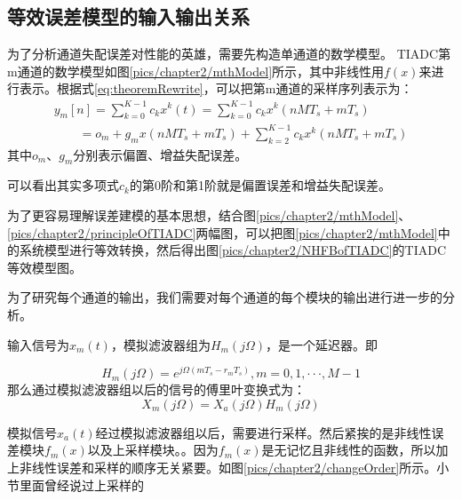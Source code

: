 	\subsection{等效误差模型的输入输出关系}
		为了分析通道失配误差对性能的英雄，需要先构造单通道的数学模型。
		TIADC第m通道的数学模型如图\ref{pics/chapter2/mthModel}所示，其中非线性用$f(x)$来进行表示。根据式\ref{eq:theoremRewrite}，可以把第m通道的采样序列表示为：
			\begin{equation}
				\begin{array}{l}
{y_m}\left[ n \right] = \sum\limits_{k = 0}^{K - 1} {{c_k}{x^k}\left( t \right)}  = \sum\limits_{k = 0}^{K - 1} {{c_k}{x^k}\left( {nM{T_s} + m{T_s}} \right)} \\
\,\,\,\,\,\,\,\,\,\,\,\, = {o_m} + {g_m}x\left( {nM{T_s} + m{T_s}} \right) + \sum\limits_{k = 2}^{K - 1} {{c_k}{x^k}\left( {nM{T_s} + m{T_s}} \right)} 
\end{array}
			\end{equation}
		其中$o_m$、$g_m$分别表示偏置、增益失配误差。\par
		可以看出其实多项式$c_k$的第0阶和第1阶就是偏置误差和增益失配误差。\par
		为了更容易理解误差建模的基本思想，结合图\ref{pics/chapter2/mthModel}、\ref{pics/chapter2/principleOfTIADC}两幅图，可以把图\ref{pics/chapter2/mthModel}中的系统模型进行等效转换，然后得出图\ref{pics/chapter2/NHFBofTIADC}的TIADC等效模型图。
			
		
	为了研究每个通道的输出，我们需要对每个通道的每个模块的输出进行进一步的分析。
	\par
	输入信号为${x_m}(t)$，模拟滤波器组为${H_m}(j\Omega )$，是一个延迟器。即
	
		\begin{equation}
			{H_m}(j\Omega ) = {e^{j\Omega (m{T_s} - {r_m}{T_s})}},m = 0,1, \cdot  \cdot  \cdot ,M - 1
		\end{equation}
	那么通过模拟滤波器组以后的信号的傅里叶变换式为：
		\begin{equation}
			{X_m}\left( {j\Omega } \right) = {X_a}\left( {j\Omega } \right){H_m}\left( {j\Omega } \right)
		\end{equation}
		
	模拟信号${x_a}(t)$经过模拟滤波器组以后，需要进行采样。然后紧挨的是非线性误差模块$f_m(x)$以及上采样模块。。因为$f_m(x)$是无记忆且非线性的函数，所以加上非线性误差和采样的顺序无关紧要。如图\ref{pics/chapter2/changeOrder}所示。小节里面曾经说过上采样的
	
